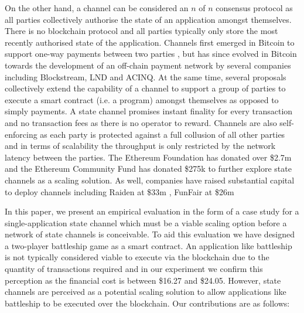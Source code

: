 \documentclass{llncs}
\begin{document}
	On the other hand, a channel can be considered an $n$ of $n$ consensus protocol as all parties collectively authorise the state of an application amongst themselves. 
	There is no blockchain protocol and all parties typically only store the most recently authorised state of the application. 
	Channels first emerged in Bitcoin to support one-way payments between two parties \cite{spilman2013,decker2015fast}, but has since evolved in Bitcoin towards the development of an off-chain payment network \cite{poon2016bitcoin} by several companies including Blockstream, LND and ACINQ. 
	At the same time, several proposals \cite{miller2017sprites,mccorry2018pisa,dziembowski2017perun,statechannelnetworks,coleman2018counterfactual,celernetwork,forcemove} collectively extend the capability of a channel to support a group of parties to execute a smart contract (i.e. a program) amongst themselves as opposed to simply payments. 
	A state channel promises instant finality for every transaction and no transaction fees as there is no operator to reward.
	Channels are also self-enforcing as each party is protected against a full collusion of all other parties and in terms of scalability the throughput is only restricted by the network latency between the parties. 
	The Ethereum Foundation has donated over \$2.7m \cite{efscaling1,efscaling2,efscaling3}  and the Ethereum Community Fund has donated \$275k \cite{ecfscaling} to further explore state channels as a scaling solution.
	As well, companies have raised substantial capital to deploy channels including Raiden at \$33m \cite{raidenICO}, FunFair at \$26m \cite{funfair}
	
	In this paper, we present an empirical evaluation in the form of a case study for a single-application state channel which must be a viable scaling option before a network of state channels is conceivable. 
	To aid this evaluation we have designed a two-player battleship game as a smart contract.
	An application like battleship is not typically considered viable to execute via the blockchain due to the quantity of transactions required and in our experiment we confirm this perception as the financial cost is between \$16.27 and \$24.05. 
	However, state channels are perceived as a potential scaling solution to allow applications like battleship to be executed over the blockchain. 
	Our contributions are as follows: 
	
\end{document}

